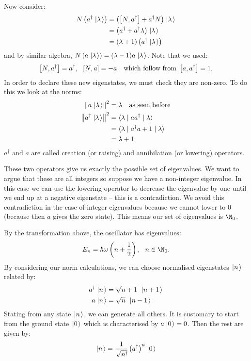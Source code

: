 \documentclass[../Main.tex]{subfiles}
\begin{document}
Now consider:
\begin{align*}
    N\left(a^\dagger \left.\left|\lambda\right.\right\rangle\right) &= \left(\left[N, a^\dagger\right] + a^\dagger N\right)\left.\left|\lambda\right.\right\rangle \\
    &= \left(a^\dagger + a^\dagger \lambda\right) \left.\left|\lambda\right.\right\rangle \\
    &= (\lambda + 1) \left(a^\dagger \left.\left|\lambda\right.\right\rangle\right)
\end{align*}
and by similar algebra, $N\left(a \left.\left|\lambda\right.\right\rangle\right) = (\lambda - 1) a\left.\left|\lambda\right.\right\rangle$. Note that we used:
\begin{equation*}
    \left[N, a^\dagger\right] = a^\dagger,~~\left[N, a\right] = -a~~\text{ which follow from } \left[a, a^\dagger\right] = 1.
\end{equation*}
In order to declare these new eigenstates, we must check they are non-zero. To do this we look at the norms:
\begin{align*}
    \left\|a\left.\left|\lambda\right.\right\rangle\right\|^2 &= \lambda~~\text{ as seen before} \\
    \left\|a^\dagger \left.\left|\lambda\right.\right\rangle\right\|^2 &= \langle\lambda\mid aa^\dagger\mid\lambda\rangle \\
    &= \langle\lambda\mid a^\dagger a + 1\mid\lambda\rangle \\
    &= \lambda + 1
\end{align*}
$a^\dagger$ and $a$ are called creation (or raising) and annihilation (or lowering) operators.

These two operators give us exactly the possible set of eigenvalues. We want to argue that these are all integers so suppose we have a non-integer eigenvalue. In this case we can use the lowering operator to decrease the eigenvalue by one until we end up at a negative eigenstate -- this is a contradiction. We avoid this contradiction in the case of integer eigenvalues because we cannot lower to $0$ (because then $a$ gives the zero state). This means our set of eigenvalues is $\N_0$.

By the transformation above, the oscillator has eigenvalues:
\begin{equation*}
    E_n = \hbar \omega \left(n + \frac12\right),~~n \in \N_0.
\end{equation*}
By considering our norm calculations, we can choose normalised eigenstates $\left.\left|n\right.\right\rangle$ related by:
\begin{align*}
    a^\dagger \left.\left|n\right.\right\rangle &= \sqrt{n+1}~\left.\left|n+1\right.\right\rangle \\
    a\left.\left|n\right.\right\rangle &= \sqrt{n}~\left.\left|n-1\right.\right\rangle.
\end{align*}
Stating from any state $\left.\left|n\right.\right\rangle$, we can generate all others. It is customary to start from the ground state $\left.\left|0\right.\right\rangle$ which is characterised by $a\left.\left|0\right.\right\rangle = 0$. Then the rest are given by:
\begin{equation*}
    \left.\left|n\right.\right\rangle = \frac{1}{\sqrt{n!}} \left(a^\dagger\right)^n\left.\left|0\right.\right\rangle
\end{equation*}
\end{document}

